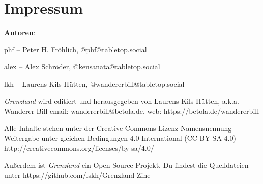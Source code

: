 \documentclass[11pt]{wbzine}
\begin{document}



\section{Impressum}

\textbf{Autoren}:

phf -- Peter H. Fröhlich, @phf@tabletop.social

alex -- Alex Schröder, @kensanata@tabletop.social 

lkh -- Laurens Kils-Hütten, @wandererbill@tabletop.social 

\textit{Grenzland} wird editiert und
herausgegeben von Laurens Kils-Hütten,
a.k.a. Wanderer Bill
email: wandererbill@betola.de, web: https://betola.de/wandererbill

Alle Inhalte stehen unter der Creative Commons Lizenz
Namensnennung -- Weitergabe unter gleichen Bedingungen 4.0 International (CC BY-SA 4.0)\\
http://creativecommons.org/licenses/by-sa/4.0/

Außerdem ist \textit{Grenzland} ein Open Source Projekt. Du
findest die Quelldateien unter 
https://github.com/lskh/Grenzland-Zine

\end{document}
